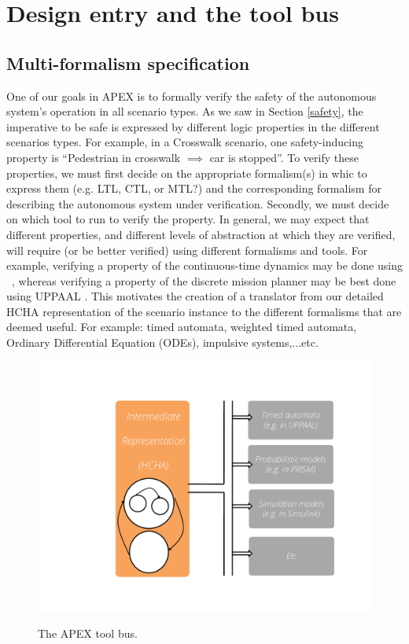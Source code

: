 \section{Design entry and the tool bus}
\label{designEntryAndToolBus}

\subsection{Multi-formalism specification}
\label{tool bus}
One of our goals in APEX is to formally verify the safety of the autonomous system's operation in all scenario types.
As we saw in Section \ref{safety}, the imperative to be safe is expressed by different logic properties in the different scenarios types.
For example, in a Crosswalk scenario, one safety-inducing property is ``Pedestrian in crosswalk $\implies$ car is stopped''.
To verify these properties, we must first decide on the appropriate formalism(s) in whic to express them (e.g. LTL, CTL, or MTL?) 
and the corresponding formalism for describing the autonomous system under verification.
Secondly, we must decide on which tool to run to verify the property.
In general, we may expect that different properties, and different levels of abstraction at which they are verified, will require (or be better verified) using different formalisms and tools. 
For example, verifying a property of the continuous-time dynamics may be done using {\staliro}~\cite{AnnapureddyLFS11tacas},
whereas verifying a property of the discrete mission planner may be best done using UPPAAL \cite{BehrmannDLHPYH06qest}.
This motivates the creation of a translator from our detailed HCHA representation of the scenario instance to the different formalisms that are deemed useful. 
For example: timed automata, weighted timed automata, Ordinary Differential Equation (ODEs), impulsive systems,...etc.

\begin{figure}[tb]
	\centering
		\includegraphics[scale=0.3]{figures/toolbus.pdf}
	\label{fig:toolbus}
	\caption{The APEX tool bus.}
\end{figure}

